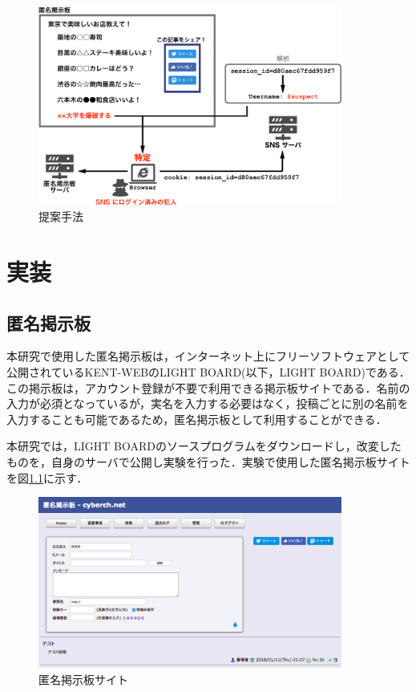 \documentclass[10pt, a4paper]{jreport}
\begin{document}
\begin{figure}[H]
	\begin{center}
		\includegraphics[width=100mm]{figures/proposed_system_2.pdf}
	\end{center}
	\caption{提案手法}
	\label{fig: proposed_system_2}
\end{figure}











\chapter{実装}
\section{匿名掲示板}\label{sec: bbs}
本研究で使用した匿名掲示板は，インターネット上にフリーソフトウェアとして公開されているKENT-WEBのLIGHT BOARD(以下，LIGHT BOARD)である\cite{kent_web_bbs}．この掲示板は，アカウント登録が不要で利用できる掲示板サイトである．名前の入力が必須となっているが，実名を入力する必要はなく，投稿ごとに別の名前を入力することも可能であるため，匿名掲示板として利用することができる．

本研究では，LIGHT BOARDのソースプログラムをダウンロードし，改変したものを，自身のサーバで公開し実験を行った．実験で使用した匿名掲示板サイトを図\ref{fig: bbs_screenshot}に示す．

\begin{figure}[H]
	\begin{center}
		\includegraphics[width=100mm]{figures/bbs_screenshot.png}
	\end{center}
	\caption{匿名掲示板サイト}
	\label{fig: bbs_screenshot}
\end{figure}
\end{document}
